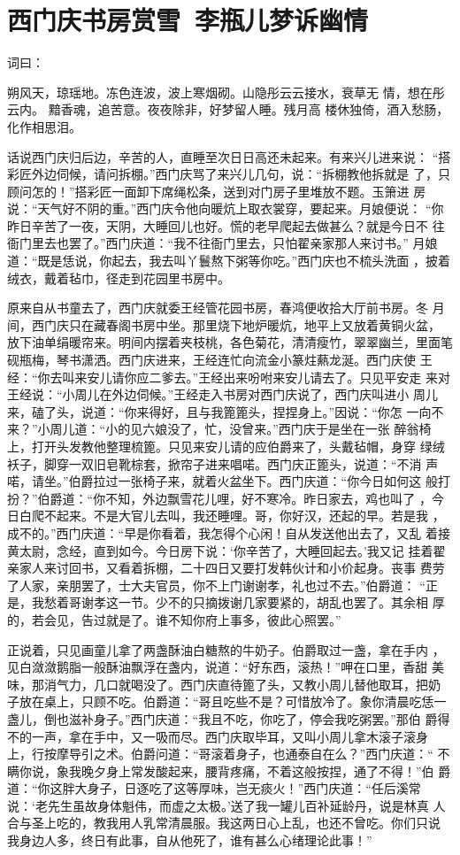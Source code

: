 \chapter{西门庆书房赏雪~李瓶儿梦诉幽情}

词曰：

朔风天，琼瑶地。冻色连波，波上寒烟砌。山隐彤云云接水，衰草无
情，想在彤云内。  黯香魂，追苦意。夜夜除非，好梦留人睡。残月高
楼休独倚，酒入愁肠，化作相思泪。

话说西门庆归后边，辛苦的人，直睡至次日日高还未起来。有来兴儿进来说：
“搭彩匠外边伺候，请问拆棚。”西门庆骂了来兴儿几句，说：“拆棚教他拆就是
了，只顾问怎的！”搭彩匠一面卸下席绳松条，送到对门房子里堆放不题。玉箫进
房说：“天气好不阴的重。”西门庆令他向暖炕上取衣裳穿，要起来。月娘便说：
“你昨日辛苦了一夜，天阴，大睡回儿也好。慌的老早爬起去做甚么？就是今日不
往衙门里去也罢了。”西门庆道：“我不往衙门里去，只怕翟亲家那人来讨书。”
月娘道：“既是恁说，你起去，我去叫丫鬟熬下粥等你吃。”西门庆也不梳头洗面
，披着绒衣，戴着毡巾，径走到花园里书房中。

原来自从书童去了，西门庆就委王经管花园书房，春鸿便收拾大厅前书房。冬
月间，西门庆只在藏春阁书房中坐。那里烧下地炉暖炕，地平上又放着黄铜火盆，
放下油单绢暖帘来。明间内摆着夹枝桃，各色菊花，清清瘦竹，翠翠幽兰，里面笔
砚瓶梅，琴书潇洒。西门庆进来，王经连忙向流金小篆炷爇龙涎。西门庆使
王经：“你去叫来安儿请你应二爹去。”王经出来吩咐来安儿请去了。只见平安走
来对王经说：“小周儿在外边伺候。”王经走入书房对西门庆说了，西门庆叫进小
周儿来，磕了头，说道：“你来得好，且与我篦篦头，捏捏身上。”因说：“你怎
一向不来？”小周儿道：“小的见六娘没了，忙，没曾来。”西门庆于是坐在一张
醉翁椅上，打开头发教他整理梳篦。只见来安儿请的应伯爵来了，头戴毡帽，身穿
绿绒袄子，脚穿一双旧皂靴棕套，掀帘子进来唱喏。西门庆正篦头，说道：“不消
声喏，请坐。”伯爵拉过一张椅子来，就着火盆坐下。西门庆道：“你今日如何这
般打扮？”伯爵道：“你不知，外边飘雪花儿哩，好不寒冷。昨日家去，鸡也叫了
，今日白爬不起来。不是大官儿去叫，我还睡哩。哥，你好汉，还起的早。若是我
，成不的。”西门庆道：“早是你看着，我怎得个心闲！自从发送他出去了，又乱
着接黄太尉，念经，直到如今。今日房下说：‘你辛苦了，大睡回起去。’我又记
挂着翟亲家人来讨回书，又看着拆棚，二十四日又要打发韩伙计和小价起身。丧事
费劳了人家，亲朋罢了，士大夫官员，你不上门谢谢孝，礼也过不去。”伯爵道：
“正是，我愁着哥谢孝这一节。少不的只摘拨谢几家要紧的，胡乱也罢了。其余相
厚的，若会见，告过就是了。谁不知你府上事多，彼此心照罢。”

正说着，只见画童儿拿了两盏酥油白糖熬的牛奶子。伯爵取过一盏，拿在手内
，见白潋潋鹅脂一般酥油飘浮在盏内，说道：“好东西，滚热！”呷在口里，香甜
美味，那消气力，几口就喝没了。西门庆直待篦了头，又教小周儿替他取耳，把奶
子放在桌上，只顾不吃。伯爵道：“哥且吃些不是？可惜放冷了。象你清晨吃恁一
盏儿，倒也滋补身子。”西门庆道：“我且不吃，你吃了，停会我吃粥罢。”那伯
爵得不的一声，拿在手中，又一吸而尽。西门庆取毕耳，又叫小周儿拿木滚子滚身
上，行按摩导引之术。伯爵问道：“哥滚着身子，也通泰自在么？”西门庆道：“
不瞒你说，象我晚夕身上常发酸起来，腰背疼痛，不着这般按捏，通了不得！”伯
爵道：“你这胖大身子，日逐吃了这等厚味，岂无痰火！”西门庆道：“任后溪常
说：‘老先生虽故身体魁伟，而虚之太极。’送了我一罐儿百补延龄丹，说是林真
人合与圣上吃的，教我用人乳常清晨服。我这两日心上乱，也还不曾吃。你们只说
我身边人多，终日有此事，自从他死了，谁有甚么心绪理论此事！”

